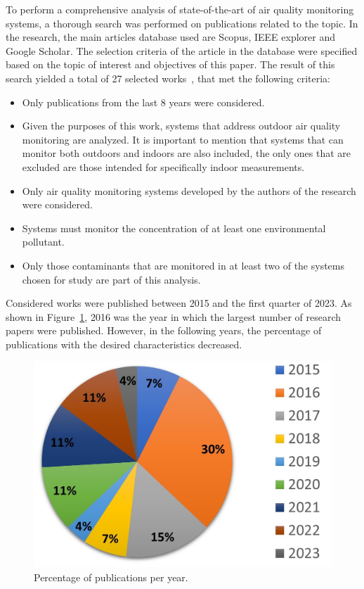 \documentclass[10pt]{../imeko_acta}
\begin{document}
To perform a comprehensive analysis of state-of-the-art of air quality monitoring systems, a thorough search was performed on publications related to the topic. In the research, the main articles database used are Scopus, IEEE explorer and  Google Scholar. The selection criteria of the article in the database were specified based on the topic of interest and objectives of this paper. The result of this search yielded a total of 27 selected works~\cite{JABBAR2022100540, liu2016low,wivou2016air,yang2015smart,gunawan2018design, purkayastha2021iot, kadir2021cloud, truong2021design, spandonidis2020compact,kumar2017air,sun2016development,de2020iot,PALOMEQUEMANGUT2022135948, s22020502, 8663367, chaudhari2017iot, zakaria2018wireless, deshmukh2016low, kaur2016air, pal2023remote, al2015monitoring, brienza2015low, phala2016air, kumar2020design, ahmed2017real, khedo2017low, fioccola2016polluino}, that met the following criteria:
\begin{itemize}
    \item Only publications from the last 8 years were considered.
    \item Given the purposes of this work, systems that address outdoor air quality monitoring are analyzed. It is important to mention that systems that can monitor both outdoors and indoors are also included, the only ones that are excluded are those intended for specifically indoor measurements.
    \item Only air quality monitoring systems developed by the authors of the research were considered. 
    \item Systems must monitor the concentration of at least one environmental pollutant.
    \item Only those contaminants that are monitored in at least two of the systems chosen for study are part of this analysis.
\end{itemize}

Considered works were published between 2015 and the first quarter of 2023. As shown in Figure~\ref{publications_year}, 2016 was the year in which the largest number of research papers were published. However,  in the following years, the percentage of publications with the desired characteristics decreased.

\begin{figure}[!tb]
	\centering
	\includegraphics[width=0.7\linewidth]{number_papers_year.jpg}
	\caption{Percentage of publications per year.
        \label{publications_year}}
\end{figure}
\end{document}
